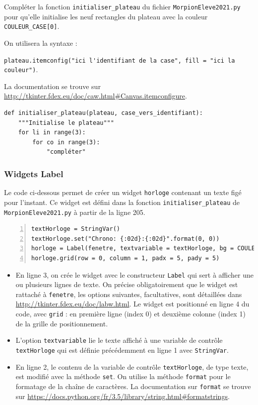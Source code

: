 \documentclass[a4paper, french, 12pt]{article}  %
\newcounter{exo}
\newcounter{exoB}
\newenvironment{exerciceB2}
{\par \bigskip  \noindent \addtocounter{exoB}{1} \hrulefill \quad { \large \textbf{Exercice \theexoB}} \quad \hrulefill \par \medskip }
{\par \bigskip }
\newcounter{act}
\newcounter{def}
\begin{document}
\begin{exerciceB2}{}
Compléter la fonction \lstinline+initialiser_plateau+ du fichier \texttt{MorpionEleve2021.py} pour qu'elle initialise 
les neuf rectangles du plateau avec la couleur \lstinline+COULEUR_CASE[0]+. 

On utilisera  la syntaxe :

\lstinline+plateau.itemconfig("ici l'identifiant de la case", fill = "ici la couleur")+.


La documentation se trouve sur \url{http://tkinter.fdex.eu/doc/caw.html#Canvas.itemconfigure}. 

\begin{lstlisting}
def initialiser_plateau(plateau, case_vers_identifiant):
    """Initialise le plateau"""
    for li in range(3):
        for co in range(3):
            "compléter"
\end{lstlisting}

\end{exerciceB2}


\subsubsection{Widgets Label}

Le code ci-dessous permet de créer un widget \lstinline+horloge+ contenant un texte figé pour l'instant. Ce widget est défini dans la fonction \lstinline+initialiser_plateau+ de \texttt{MorpionEleve2021.py} à partir de la ligne 205.

\begin{lstlisting}[numbers=left]
textHorloge = StringVar()  
textHorloge.set("Chrono: {:02d}:{:02d}".format(0, 0))
horloge = Label(fenetre, textvariable = textHorloge, bg = COULEUR_BOUTON, relief = 'raised')
horloge.grid(row = 0, column = 1, padx = 5, pady = 5)
\end{lstlisting}

\begin{itemize}[label=]
	\item En ligne 3, on crée le widget avec le constructeur \lstinline+Label+ qui sert à afficher une ou plusieurs lignes de texte. On précise obligatoirement que le widget est rattaché à \lstinline+fenetre+, les options suivantes, facultatives, sont  détaillées dans \url{http://tkinter.fdex.eu/doc/labw.html}. Le widget est positionné en ligne 4 du code, avec \lstinline+grid+ : en première ligne (index 0) et deuxième colonne (index 1) de la grille de positionnement.
	\item L'option \lstinline+textvariable+ lie le texte affiché à une variable de contrôle \lstinline+textHorloge+ qui est définie précédemment en ligne 1 avec \lstinline+StringVar+. 
	 \item En ligne 2, le contenu de la  variable de contrôle \lstinline+textHorloge+, de type texte, est modifié avec la méthode \lstinline+set+. On utilise la méthode \lstinline+format+ pour le formatage de la chaîne de caractères. La documentation sur \lstinline+format+ se trouve sur \url{https://docs.python.org/fr/3.5/library/string.html#formatstrings}.
\end{itemize}
\end{document}
